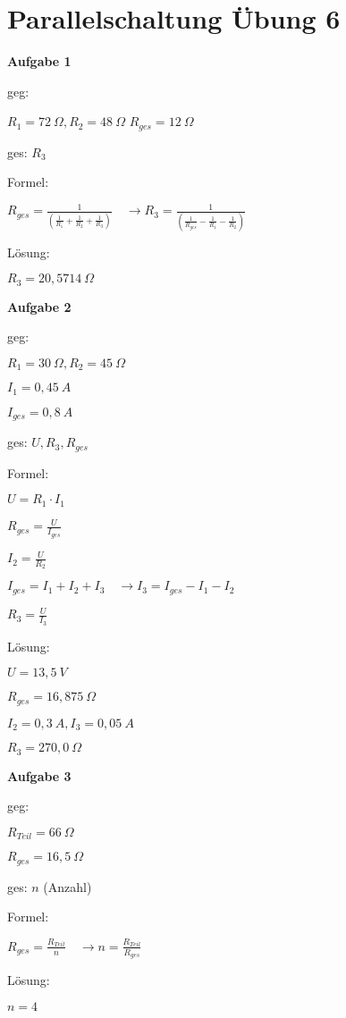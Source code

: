 \section{Parallelschaltung Übung 6}\label{parallelschaltung-uebung-6}

\textbf{Aufgabe 1}

geg:

$R_1 = 72~\Omega, R_2 = 48~\Omega$ $R_{ges} = 12~\Omega$

ges: $R_3$

Formel:

$R_{ges} = \frac{1}{(\frac{1}{R_1} + \frac{1}{R_2} + \frac{1}{R_3})} \quad \to R_3 = \frac{1}{(\frac{1}{R_{ges}} - \frac{1}{R_1} - \frac{1}{R_2})}$

Lösung:

$R_3 = 20,5714~\Omega$

\textbf{Aufgabe 2}

geg: \textbar\textbar{}

$R_1 = 30~\Omega, R_2 = 45~\Omega$

$I_1 = 0,45~A$

$I_{ges} = 0,8~A$

ges: $U, R_3, R_{ges}$

Formel:

$U = R_1 \cdot I_1$

$R_{ges} = \frac{U}{I_{ges}}$

$I_2 = \frac{U}{R_2}$

$I_{ges} = I_1 + I_2 + I_3 \quad \to I_3 = I_{ges} - I_1 - I_2$

$R_3 = \frac{U}{I_3}$

Lösung:

$U = 13,5~V$

$R_{ges} = 16,875~\Omega$

$I_2 = 0,3~A, I_3 = 0,05~A$

$R_3 = 270,0~\Omega$

\newpage

\textbf{Aufgabe 3}

geg:

$R_{Teil} = 66~\Omega$

$R_{ges} = 16,5~\Omega$

ges: $n$ (Anzahl)

Formel:

$R_{ges} = \frac{R_{Teil}}{n} \quad \to n = \frac{R_{Teil}}{R_{ges}}$

Lösung:

$n = 4$

